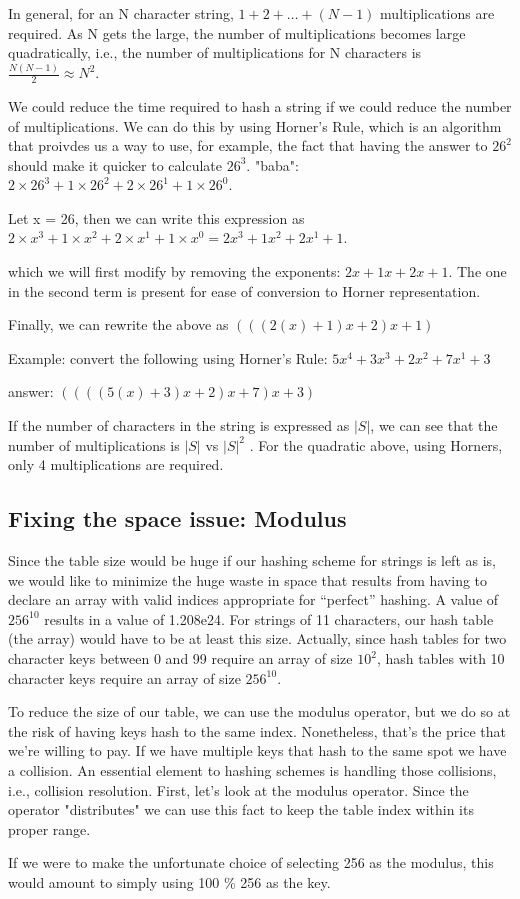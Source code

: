 \documentclass[11pt]{article} %
\begin{document}
In general, for an N character string, $1 + 2 + \ldots + (N-1)$ multiplications are required.  As N gets the large, the number of multiplications becomes large quadratically, i.e., the number of multiplications for N characters is
 $\frac{N(N-1)}{2}  \approx  N^2$.

We could reduce the time required to hash a string if we could reduce the number of multiplications.  We can do this by using Horner's Rule, which is an algorithm that proivdes us a way to use, for example, the fact that having the answer to $26^2$ should make it quicker to calculate $26^3$.
"baba": $2 \times 26^3 + 1 \times 26^2 + 2 \times 26^1 + 1 \times 26^0 $.

Let x = 26, then we can write  this expression as
$2 \times x^3 + 1 \times x^2 + 2 \times x^1 + 1 \times x^0 =2 x^3 + 1  x^2 + 2  x^1 + 1 $. 
 
which we will first modify by removing the exponents:
$2  x + 1  x + 2  x + 1 $.  The one  in the second term is present for ease of conversion to Horner representation.

Finally, we can rewrite the above as $(((2( x ) + 1) x  + 2 ) x + 1 )$

Example:  convert the following using Horner's Rule:
$5 x^4 + 3  x^3 + 2  x^2 + 7x^1 + 3 $


answer: $((((5 (x) + 3)  x+ 2)  x + 7)x + 3) $


If the number of characters in the string is expressed as $| S |$, we can see that the number of multiplications is $ |S|$  vs $ |S|^2$ .  For the quadratic above, using Horners, only 4 multiplications are required.



 \subsection{Fixing the space issue: Modulus}
Since the table size would be huge if our hashing scheme for strings is left as is, we would like to minimize the huge waste in space that results from having to declare an array with valid indices appropriate for ``perfect'' hashing.  A value of $256^10$ results in a value of 1.208e24.  For strings of 11 characters, our hash table (the array) would have to be at least this size.  Actually, since hash tables for two character keys between 0 and 99 require an array of size $10^2$, hash tables with 10 character keys require an array of size $256^10$.
 
To reduce the size of our table, we can use the modulus operator, but we do so at the risk of having keys hash to the same index.  Nonetheless, that's the price that we're willing to pay.  If we have multiple keys that hash to the same spot we have a collision.  An essential element to hashing schemes is handling those collisions, i.e., collision resolution.  First, let's look at the modulus operator.  Since the operator "distributes" we can use this fact to keep the table index within its proper range.

If we were to make the unfortunate choice of selecting 256 as the modulus, this would amount to simply using 100 \% 256 as the key.
\end{document}
